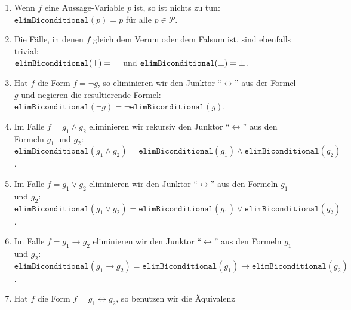 \begin{enumerate}
\item Wenn $f$ eine
      Aussage-Variable $p$ ist, so ist nichts zu tun:
      \\[0.2cm]
      \hspace*{1.3cm}
      $\texttt{elimBiconditional}(p) = p$ \quad für alle $p \in \mathcal{P}$.
\item Die Fälle, in denen $f$ gleich dem Verum oder dem Falsum ist, sind ebenfalls trivial:
      \\[0.2cm]
      \hspace*{1.3cm}
      $\texttt{elimBiconditional}(\top) = \top$ \quad und \quad
      $\texttt{elimBiconditional}(\bot) = \bot$.
\item Hat $f$ die Form $f = \neg g$, so eliminieren wir den Junktor
      ``$\leftrightarrow$'' aus der Formel $g$ und negieren die resultierende Formel: \\[0.2cm]
      \hspace*{1.3cm} 
      $\texttt{elimBiconditional}(\neg g) = \neg \texttt{elimBiconditional}(g)$.
\item Im Falle $f = g_1 \wedge g_2$ eliminieren wir rekursiv den Junktor
      ``$\leftrightarrow$'' aus den Formeln $g_1$ und $g_2$: \\[0.2cm]
      \hspace*{1.3cm} 
      $\texttt{elimBiconditional}(g_1 \wedge g_2) = \texttt{elimBiconditional}(g_1) \wedge \texttt{elimBiconditional}(g_2)$.
\item Im Falle $f = g_1 \vee g_2$ eliminieren wir den Junktor
      ``$\leftrightarrow$'' aus den Formeln $g_1$ und $g_2$: \\[0.2cm]
      \hspace*{1.3cm} 
      $\texttt{elimBiconditional}(g_1 \vee g_2) = \texttt{elimBiconditional}(g_1) \vee \texttt{elimBiconditional}(g_2)$.
\item Im Falle $f = g_1 \rightarrow g_2$ eliminieren wir den Junktor
      ``$\leftrightarrow$'' aus den Formeln $g_1$ und $g_2$: \\[0.2cm]
      \hspace*{1.3cm} 
      $\texttt{elimBiconditional}(g_1 \rightarrow g_2) = \texttt{elimBiconditional}(g_1) \rightarrow \texttt{elimBiconditional}(g_2)$.
\item Hat $f$ die Form $f = g_1 \leftrightarrow g_2$, so benutzen wir die
      Äquivalenz \\[0.2cm]
      \hspace*{1.3cm} 

\end{enumerate}
